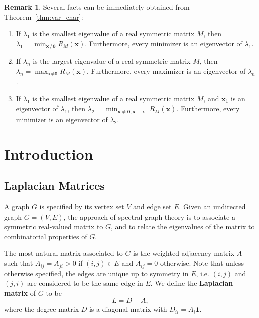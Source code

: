 \documentclass[a4paper]{article}
\theoremstyle{definition}
\newtheorem{remark}{Remark}[section]
\begin{document}
\begin{remark}
Several facts can be immediately obtained from Theorem~\ref{thm:var_char}:
\begin{enumerate}
    \item If $\lambda_1$ is the smallest eigenvalue of a real symmetric matrix $M$, then $\lambda_1=\min_{\textbf{x}\neq \textbf{0}}R_M(\textbf{x})$. Furthermore, every minimizer is an eigenvector of $\lambda_1$.
    \item If $\lambda_n$ is the largest eigenvalue of a real symmetric matrix $M$, then $\lambda_n=\max_{\textbf{x}\neq \textbf{0}}R_{M}(\textbf{x})$. Furthermore, every maximizer is an eigenvector of $\lambda_n$.
    \item If $\lambda_1$ is the smallest eigenvalue of a real symmetric matrix $M$, and $\textbf{x}_1$ is an eigenvector of $\lambda_1$, then $\lambda_2=\min_{\textbf{x}\neq \textbf{0}, \textbf{x}\perp\textbf{x}_1}R_M(\textbf{x})$. Furthermore, every minimizer is an eigenvector of $\lambda_2$.
\end{enumerate}
\end{remark}

\section{Introduction}

\subsection{Laplacian Matrices}

A graph $G$ is specified by its vertex set $V$ and edge set $E$. Given an undirected graph $G=(V, E)$, the approach of spectral graph theory is to associate a symmetric real-valued matrix to $G$, and to relate the eigenvalues of the matrix to combinatorial properties of $G$.

The most natural matrix associated to $G$ is the weighted adjacency matrix $A$ such that $A_{ij}=A_{ji}> 0$ if $(i, j)\in E$ and $A_{ij}=0$ otherwise. Note that unless otherwise specified, the edges are unique up to symmetry in $E$, i.e. $(i, j)$ and $(j, i)$ are considered to be the same edge in $E$. We define the \textbf{Laplacian matrix} of $G$ to be 
\begin{equation}
L=D-A,
\end{equation}
where the degree matrix $D$ is a diagonal matrix with $D_{ii}=A_i\textbf{1}$.
\end{document}
